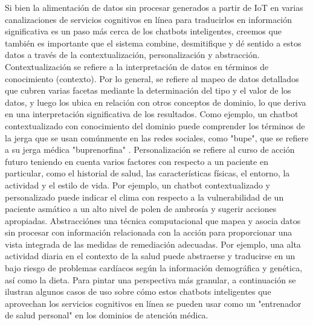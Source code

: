 Si bien la alimentación de datos sin procesar generados a partir de IoT en varias canalizaciones de servicios cognitivos en línea para traducirlos en información significativa es un paso más cerca de los chatbots inteligentes, creemos que también es importante que el sistema combine, desmitifique y dé sentido a estos datos a través de la contextualización, personalización y abstracción. Contextualización se refiere a la interpretación de datos en términos de conocimiento (contexto). Por lo general, se refiere al mapeo de datos detallados que cubren varias facetas mediante la determinación del tipo y el valor de los datos, y luego los ubica en relación con otros conceptos de dominio, lo que deriva en una interpretación significativa de los resultados. Como ejemplo, un chatbot contextualizado con conocimiento del dominio puede comprender los términos de la jerga que se usan comúnmente en las redes sociales, como "bupe", que se refiere a su jerga médica "buprenorfina" \cite{Rojas}. Personalización se refiere al curso de acción futuro teniendo en cuenta varios factores con respecto a un paciente en particular, como el historial de salud, las características físicas, el entorno, la actividad y el estilo de vida. Por ejemplo, un chatbot contextualizado y personalizado puede indicar el clima con respecto a la vulnerabilidad de un paciente asmático a un alto nivel de polen de ambrosía y sugerir acciones apropiadas. Abstracciónes una técnica computacional que mapea y asocia datos sin procesar con información relacionada con la acción para proporcionar una vista integrada de las medidas de remediación adecuadas. Por ejemplo, una alta actividad diaria en el contexto de la salud puede abstraerse y traducirse en un bajo riesgo de problemas cardíacos según la información demográfica y genética, así como la dieta. Para pintar una perspectiva más granular, a continuación se ilustran algunos casos de uso sobre cómo estos chatbots inteligentes que aprovechan los servicios cognitivos en línea se pueden usar como un "entrenador de salud personal" en los dominios de atención médica.


